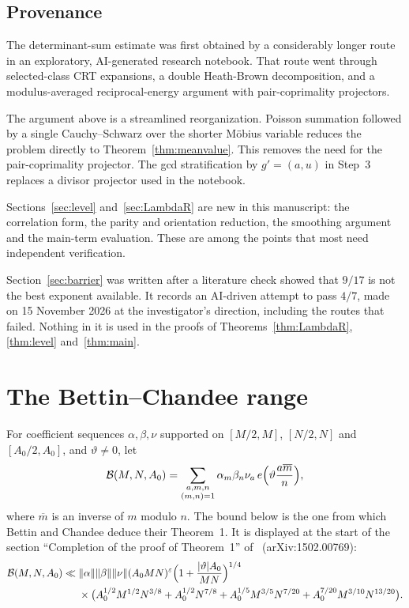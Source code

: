 \documentclass[11pt]{amsart}
\theoremstyle{definition}
\theoremstyle{remark}
\numberwithin{equation}{section}
\newcommand{\cB}{\mathcal B}
\newcommand{\eps}{\varepsilon}
\newcommand{\inv}[1]{\overline{#1}}
\begin{document}
\subsection{Provenance}
The determinant-sum estimate was first obtained by a considerably longer
route in an exploratory, AI-generated research notebook.  That route went
through selected-class CRT expansions, a double Heath-Brown decomposition,
and a modulus-averaged reciprocal-energy argument with pair-coprimality
projectors.

The argument above is a streamlined reorganization.  Poisson summation
followed by a single Cauchy--Schwarz over the shorter M\"obius variable
reduces the problem directly to Theorem~\ref{thm:meanvalue}.  This removes
the need for the pair-coprimality projector.  The gcd stratification by
$g'=(a,u)$ in Step~3 replaces a divisor projector used in the notebook.

Sections~\ref{sec:level} and~\ref{sec:LambdaR} are new in this manuscript:
the correlation form, the parity and orientation reduction, the smoothing
argument and the main-term evaluation.  These are among the points that
most need independent verification.

Section~\ref{sec:barrier} was written after a literature check showed that
$9/17$ is not the best exponent available.  It records an AI-driven attempt
to pass $4/7$, made on 15 November 2026 at the investigator's direction,
including the routes that failed.  Nothing in it is used in the proofs of
Theorems~\ref{thm:LambdaR}, \ref{thm:level} and~\ref{thm:main}.

\appendix

\section{The Bettin--Chandee range}\label{app:BC}

For coefficient sequences $\alpha,\beta,\nu$ supported on $[M/2,M]$,
$[N/2,N]$ and $[A_0/2,A_0]$, and $\vartheta\ne0$, let
\[
 \cB(M,N,A_0)=\sum_{\substack{a,m,n\\(m,n)=1}}\alpha_m\beta_n\nu_a\,
 e\Bigl(\vartheta\frac{a\inv m}{n}\Bigr),
\]
where $\inv m$ is an inverse of $m$ modulo $n$.  The bound below is the one
from which Bettin and Chandee deduce their Theorem~1.  It is displayed at
the start of the section ``Completion of the proof of Theorem~1''
of~\cite{BC} (arXiv:1502.00769):
\begin{equation}\label{eq:BC}
\begin{split}
 \cB(M,N,A_0)\ll{}&\|\alpha\|\|\beta\|\|\nu\|(A_0MN)^{\eps}
 \Bigl(1+\frac{|\vartheta|A_0}{MN}\Bigr)^{1/4}\\
 &\times\bigl(A_0^{1/2}M^{1/2}N^{3/8}+A_0^{1/2}N^{7/8}
 +A_0^{1/5}M^{3/5}N^{7/20}+A_0^{7/20}M^{3/10}N^{13/20}\bigr).
\end{split}
\end{equation}
\end{document}
